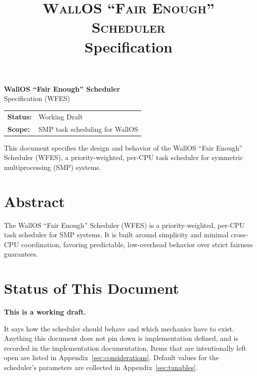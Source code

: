 \documentclass[11pt]{article}
\title{\textsc{WallOS ``Fair Enough'' Scheduler}\\[4pt]\large Specification}
\author{}
\date{}
\begin{document}

\begin{titlepage}
	\centering
	\vspace*{3cm}
	{\Huge\bfseries WallOS ``Fair Enough'' Scheduler}\\[0.5cm]
	{\Large Specification (WFES)}\\[2cm]

	\begin{tabular}{ll}
		\textbf{Status:} & Working Draft                  \\
		\textbf{Scope:}  & SMP task scheduling for WallOS \\
	\end{tabular}

	\vfill

	{\small
		This document specifies the design and behavior of the WallOS ``Fair Enough'' Scheduler (WFES), a priority-weighted, per-CPU task scheduler for symmetric multiprocessing (SMP) systems.
	}

\end{titlepage}

\tableofcontents


\section*{Abstract}

The WallOS ``Fair Enough'' Scheduler (WFES) is a priority-weighted, per-CPU task scheduler for SMP systems.
It is built around simplicity and minimal cross-CPU coordination, favoring predictable, low-overhead behavior over strict fairness guarantees.

\section*{Status of This Document}

\textbf{This is a working draft.}

It says how the scheduler should behave and which mechanics have to exist.
Anything this document does not pin down is implementation defined, and is recorded in the implementation documentation.
Items that are intentionally left open are listed in Appendix~\ref{sec:considerations}.
Default values for the scheduler's parameters are collected in Appendix~\ref{sec:tunables}.
\end{document}
